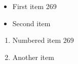 \documentclass{article}
\begin{document}
\begin{itemize}
\item First item 269
\item Second item
\end{itemize}
\begin{enumerate}
\item Numbered item 269
\item Another item
\end{enumerate}
\end{document}
